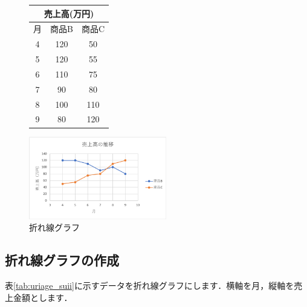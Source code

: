 \begin{figure}[htbp]
    \begin{minipage}{0.5\hsize}
        \centering
        \makeatletter
        \def\@captype{table}
        \makeatother
        \caption{}
        \begin{tabular}{|c|c|c|}
          \hline
          \multicolumn{3}{|c|}{売上高(万円)}\\ \hline
          月& 商品B & 商品C \\ \hline
          4 &  120 & 50\\ \hline
          5 &  120 & 55\\ \hline
          6 &  110 & 75\\ \hline
          7 &  90  & 80\\ \hline
          8 &  100 & 110\\ \hline
          9 &  80  & 120\\ \hline
        \end{tabular}
        \label{tab:uriage_suii}
    \end{minipage}
    \begin{minipage}{0.5\hsize}
        \centering
        \includegraphics[width=6cm]{chap2/line.png}
        \caption{折れ線グラフ}
        \label{fig:line}
    \end{minipage}
\end{figure}

\subsection{折れ線グラフの作成}

表\ref{tab:uriage_suii}に示すデータを折れ線グラフにします．横軸を月，縦軸を売上金額とします．

